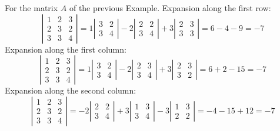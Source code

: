 \documentclass[
  letterpaper,
  DIV=11,
  numbers=noendperiod]{scrartcl}
\theoremstyle{remark}
\begin{document}
For the matrix \(A\) of the previous Example. Expansion along the first
row: \[\left| 
\begin{array}{ccc}
1 & 2 & 3 \\ 
2 & 3 & 2 \\ 
3 & 3 & 4
\end{array}
\right| =  1  \left| \begin{array}{cc}
3 & 2 \\ 
 3 & 4
\end{array} \right| - 2  \left| \begin{array}{cc}
2 & 2 \\ 
3 & 4
\end{array}  \right| +3 \left| \begin{array}{cc}
2 & 3 \\ 
3 & 3
\end{array}  \right| =  6-4 -9 =-7\] Expansion along the first column:
\[\left| 
\begin{array}{ccc}
1 & 2 & 3 \\ 
2 & 3 & 2 \\ 
3 & 3 & 4
\end{array}
\right| =  1  \left| \begin{array}{cc}
3 & 2 \\ 
 3 & 4
\end{array} \right| - 2  \left| \begin{array}{cc}
2 & 3 \\ 
3 & 4
\end{array}  \right| + 3\left| \begin{array}{cc}
2 & 3 \\ 
3 & 2
\end{array}  \right| =6+2-15=-7\] Expansion along the second column:
\[\left| 
\begin{array}{ccc}
1 & 2 & 3 \\ 
2 & 3 & 2 \\ 
3 & 3 & 4
\end{array}
\right| =  - 2  \left| \begin{array}{cc}
2 & 2 \\ 
3 & 4
\end{array}  \right| +3 \left| \begin{array}{cc}
1 & 3 \\ 
3 & 4
\end{array}  \right| -3 \left| \begin{array}{cc}
1 & 3 \\ 
2 & 2
\end{array}  \right| =  -4 -15 +12=-7\]
\end{document}
